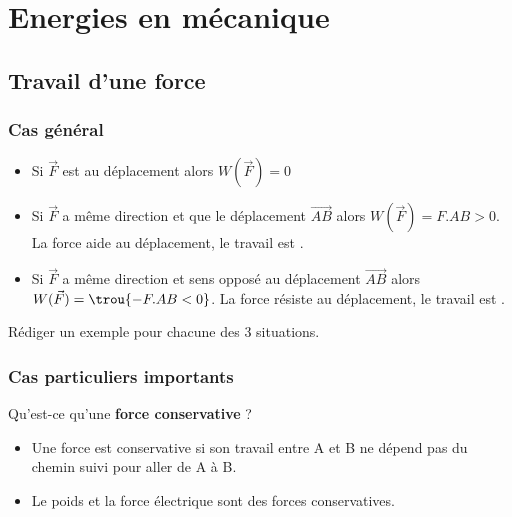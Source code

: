 \setcounter{chapter}{6}
\chapter{Energies en mécanique}

\section{Travail d'une force}
\subsection{Cas général}


\begin{itemize}
	\item Si $\vec{F}$ est  au déplacement alors $W(\vec{F})=0$
	\item Si $\vec{F}$ a même direction et  que le déplacement $\vec{AB}$ alors $W(\vec{F})=F.AB>0$. La force aide au déplacement, le travail est .
	\item Si $\vec{F}$ a même direction et sens opposé au déplacement $\vec{AB}$ alors $W(\vec{F})=\trou{ - F.AB<0}$. La force résiste au déplacement, le travail est .
\end{itemize}

 Rédiger un exemple pour chacune des 3 situations. \vspace{5cm}

\subsection{Cas particuliers importants }
 Qu'est-ce qu'une \textbf{force conservative } ?\\
\begin{itemize}
	\item Une force est conservative si son travail entre A et B ne dépend pas du chemin suivi pour aller de A à B. 
	\item Le poids et la force électrique sont des forces conservatives. 
\end{itemize}


